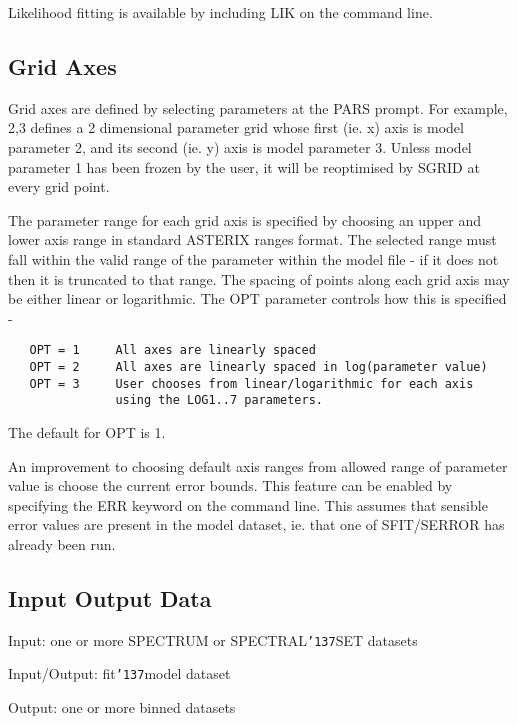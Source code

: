 \documentclass{book}
\renewcommand{\_}{{\tt\char'137}}     %
\begin{document}
Likelihood fitting is available by including LIK on the
command line.
 
\subsection{Grid Axes}
Grid axes are defined by selecting parameters at the PARS prompt.
For example, 2,3 defines a 2 dimensional parameter grid whose
first (ie. x) axis is model parameter 2, and its second (ie. y)
axis is model parameter 3. Unless model parameter 1 has been
frozen by the user, it will be reoptimised by SGRID at every
grid point.
 
The parameter range for each grid axis is specified by choosing
an upper and lower axis range in standard ASTERIX ranges
format. The selected range must fall within the valid range of
the parameter within the model file - if it does not then it is
truncated to that range. The spacing of points along each grid
axis may be either linear or logarithmic. The OPT parameter
controls how this is specified -
\begin{verbatim}
   OPT = 1     All axes are linearly spaced
   OPT = 2     All axes are linearly spaced in log(parameter value)
   OPT = 3     User chooses from linear/logarithmic for each axis
               using the LOG1..7 parameters.
\end{verbatim}
The default for OPT is 1.
 
An improvement to choosing default axis ranges from allowed
range of parameter value is choose the current error bounds. This
feature can be enabled by specifying the ERR keyword on the
command line. This assumes that sensible error values are present
in the model dataset, ie. that one of SFIT/SERROR has already been
run.
 
\subsection{Input Output Data}
Input: one or more SPECTRUM or SPECTRAL\_SET datasets
 
Input/Output: fit\_model dataset
 
Output: one or more binned datasets
 
\end{document}
